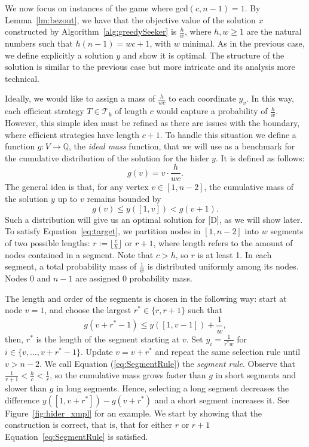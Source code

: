 \documentclass[11pt]{article}
\newcommand\+{\mkern2mu}
\newcommand{\T}{T}
\begin{document}
We now focus on instances of the game where gcd$(c,n-1)=1$. By Lemma~\ref{lm:bezout}, we have that the objective value of the solution $x$ constructed by Algorithm~\ref{alg:greedySeeker} is $\frac{h}{w}$, where $h, w\ge 1$ are the natural numbers such that $h (n-1) = w c + 1$, with $w$ minimal. As in the previous case, we define explicitly a solution $y$ and show it is optimal. The structure of the solution is similar to the previous case but more intricate and its analysis more technical.

Ideally, we would like to assign a mass of $\frac{h}{wc}$ to each coordinate $y_v$. In this way, each efficient strategy $\T\in \mathcal{T}_k$ of length $c$ would capture a probability of $\frac{h}{w}$. However, this simple idea must be refined as there are issues with the boundary, where efficient strategies have length $c+1$. To handle this situation we define a function $g: V \rightarrow \mathbb{Q}$, the {\it ideal mass} function, that we will use as a benchmark for the cumulative distribution of the solution for the hider $y$. It is defined as follows:
\begin{equation*}
g(v) = v \cdot \frac{h}{wc}.    
\end{equation*}
The general idea is that, for any vertex $v \in [1,n-2]$, the cumulative mass of the solution $y$ up to $v$ remains bounded by
\begin{equation}
    g(v) \leq y([1,v])< g(v+1).
    \label{eq:target}
\end{equation}
Such a distribution will give us an optimal solution for [D], as we will show later. To satisfy Equation~\eqref{eq:target}, we partition nodes in $[1,n-2]$ into $w$ segments of two possible lengths: $r:=\lfloor\frac{c}{h}\rfloor$ or $r+1$, where length refers to the amount of nodes contained in a segment. Note that $c>h$, so $r$ is at least 1. In each segment, a total probability mass of $\frac{1}{w}$ is distributed uniformly among its nodes. Nodes $0$ and $n-1$ are assigned 0 probability mass. 

The length and order of the segments is chosen in the following way: start at node $v=1$, and choose the largest $r^* \in \{r, r+1\}$ such that 
\begin{equation}
g(v+ r^* -1) \leq y([1, v-1]) + \frac{1}{w},
\label{eq:SegmentRule}
\end{equation}
then, $r^*$ is the length of the segment starting at $v$. Set $y_i = \frac{1}{r^* w}$ for $i \in \{v, \ldots, v+ r^* - 1\}$. Update $v = v + r^*$ and repeat the same selection rule until $v > n-2$. We call Equation (\ref{eq:SegmentRule}) the \emph{segment rule}. Observe that $\frac{1}{r+1} < \frac{h}{c} < \frac{1}{r} $, so the cumulative mass grows faster than $g$ in short segments and slower than $g$ in long segments. Hence, selecting a long segment decreases the difference $y([1, v+r^*]) - g(v+r^*)$ and a short segment increases it. See Figure~\ref{fig:hider_xmpl} for an example. We start by showing that the construction is correct, that is, that for either $r$ or $r+1$ Equation~\ref{eq:SegmentRule} is satisfied.
\end{document}

